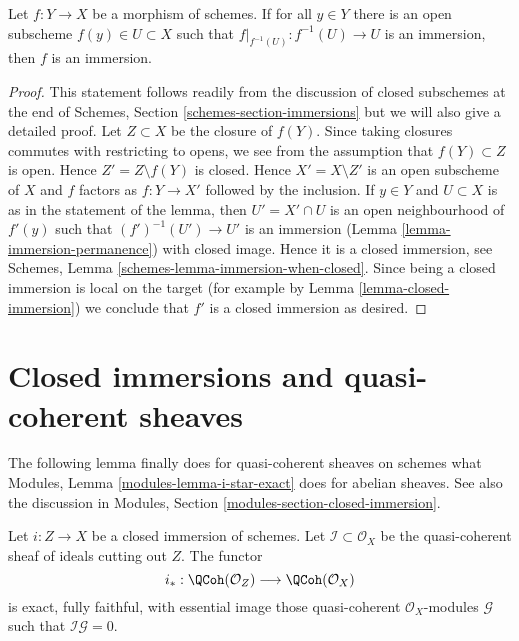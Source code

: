 \begin{lemma}
\label{lemma-check-immersion}
Let $f : Y \to X$ be a morphism of schemes. If for all $y \in Y$
there is an open subscheme $f(y) \in U \subset X$ such that
$f|_{f^{-1}(U)} : f^{-1}(U) \to U$ is an immersion, then $f$ is
an immersion.
\end{lemma}

\begin{proof}
This statement follows readily from the discussion of closed subschemes
at the end of Schemes, Section \ref{schemes-section-immersions}
but we will also give a detailed proof.
Let $Z \subset X$ be the closure of $f(Y)$. Since taking closures
commutes with restricting to opens, we see from the assumption that
$f(Y) \subset Z$ is open. Hence $Z' = Z \setminus f(Y)$ is closed.
Hence $X' = X \setminus Z'$ is an open subscheme of $X$ and
$f$ factors as $f : Y \to X'$ followed by the inclusion.
If $y \in Y$ and $U \subset X$ is as in the statement
of the lemma, then $U' = X' \cap U$ is an open neighbourhood
of $f'(y)$ such that $(f')^{-1}(U') \to U'$ is an immersion
(Lemma \ref{lemma-immersion-permanence}) with closed image.
Hence it is a closed immersion, see
Schemes, Lemma \ref{schemes-lemma-immersion-when-closed}.
Since being a closed immersion is local on the target
(for example by Lemma \ref{lemma-closed-immersion})
we conclude that $f'$ is a closed immersion as desired.
\end{proof}








\section{Closed immersions and quasi-coherent sheaves}
\label{section-closed-immersions-quasi-coherent}

\noindent
The following lemma finally does for quasi-coherent sheaves on schemes
what Modules, Lemma \ref{modules-lemma-i-star-exact} does for abelian sheaves.
See also the discussion in
Modules, Section \ref{modules-section-closed-immersion}.

\begin{lemma}
\label{lemma-i-star-equivalence}
Let $i : Z \to X$ be a closed immersion of schemes. Let
$\mathcal{I} \subset \mathcal{O}_X$ be the quasi-coherent sheaf of ideals
cutting out $Z$. The functor
$$
i_* :
\QCoh(\mathcal{O}_Z)
\longrightarrow
\QCoh(\mathcal{O}_X)
$$
is exact, fully faithful, with essential image those quasi-coherent
$\mathcal{O}_X$-modules $\mathcal{G}$ such that $\mathcal{I}\mathcal{G} = 0$.
\end{lemma}

